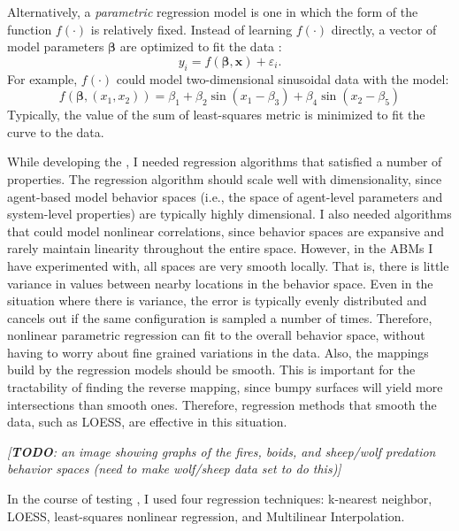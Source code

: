 Alternatively, a \textit{parametric} regression model is one in which the form of the function $f(\cdot)$ is relatively fixed.
Instead of learning $f(\cdot)$ directly, a vector of model parameters $\mathbf \beta$ are optimized to fit the data \cite{fox2002r}:
\[y_i = f(\mathbf \beta, \mathbf x) + \varepsilon_i.\]
For example, $f(\cdot)$ could model two-dimensional sinusoidal data with the model:
\[f(\mathbf \beta, (x_1, x_2)) = \beta_1 + \beta_2 \sin (x_1 - \beta_3) + \beta_4 \sin (x_2 - \beta_5)\]
Typically, the value of the sum of least-squares metric is minimized to fit the curve to the data.

While developing the \framework, I needed regression algorithms that satisfied a number of properties.
The regression algorithm should scale well with dimensionality, since agent-based model behavior spaces (i.e., the space of agent-level parameters and system-level properties) are typically highly dimensional.
I also needed algorithms that could model nonlinear correlations, since behavior spaces are expansive and rarely maintain linearity throughout the entire space.
However, in the ABMs I have experimented with, all spaces are very smooth locally.
That is, there is little variance in values between nearby locations in the behavior space.
Even in the situation where there is variance, the error is typically evenly distributed and cancels out if the same configuration is sampled a number of times.
Therefore, nonlinear parametric regression can fit to the overall behavior space, without having to worry about fine grained variations in the data.
Also, the mappings build by the regression models should be smooth.
This is important for the tractability of finding the reverse mapping, since bumpy surfaces will yield more intersections than smooth ones.
Therefore, regression methods that smooth the data, such as LOESS, are effective in this situation.

\textit{[\textbf{TODO}: an image showing graphs of the fires, boids, and sheep/wolf predation behavior spaces (need to make wolf/sheep data set to do this)]}

In the course of testing \fw, I used four regression techniques: k-nearest neighbor, LOESS, least-squares nonlinear regression, and Multilinear Interpolation.

